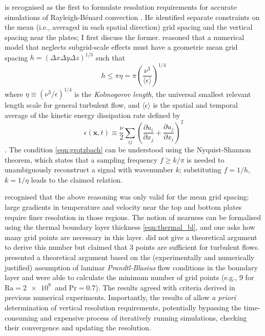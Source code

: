 \documentclass[titlepage]{article}
\numberwithin{equation}{section}
\newcommand{\pdiff}[2]{\frac{\partial #1}{\partial #2}}
\renewcommand\vec{\bm}
\newcommand{\prandtl}{\ensuremath{\mathrm{Pr}}}
\newcommand{\rayleigh}{\ensuremath{\mathrm{Ra}}}
\newcommand{\rb}{Rayleigh-B\'{e}nard}
\begin{document}
\textcite{grotzbach1983} is recognised as the first to formulate resolution
requirements for accurate simulations of \rb{} convection
\parencite{chilla2012,scheel2013}. He identified separate constraints on the
mean (i.e., averaged in each spatial direction) grid spacing and the vertical
spacing near the plates; I first discuss the former.
\citeauthor{grotzbach1983} reasoned that a numerical model that neglects
subgrid-scale effects must have a geometric mean grid spacing $h = (\Delta x
\Delta y \Delta z)^{1/3}$ such that
\begin{equation}
    \label{eqn:grotzbach}
    h \leq \pi \eta = \pi \left(
        \frac{\nu^3}{\langle \epsilon \rangle}
    \right)^{1/4}
\end{equation}
where $\eta \equiv (\nu^3/\epsilon)^{1/4}$ is the \emph{Kolmogorov length}, the
universal smallest relevant length scale for general turbulent flow, and
$\langle \epsilon \rangle$ is the spatial and temporal average of the kinetic
energy dissipation rate defined by
\begin{equation}
    \label{eqn:kinetic_dissipation}
    \epsilon(\vec{x}, t) \equiv \frac{\nu}{2} \sum_{ij} \left(
        \pdiff{u_i}{x_j} + \pdiff{u_j}{x_i}
    \right)^2
\end{equation}
\parencite{chilla2012}. The condition \cref{eqn:grotzbach} can be
understood using the Nyquist-Shannon theorem, which states that a
sampling frequency $f \geq k/\pi$ is needed to unambiguously reconstruct
a signal with wavenumber $k$; substituting $f = 1/h$, $k = 1/\eta$ leads
to the claimed relation.

\citeauthor{grotzbach1983} recognised that the above reasoning was only valid
for the mean grid spacing; large gradients in temperature and velocity near the
top and bottom plates require finer resolution in those regions. The notion of
nearness can be formalised using the thermal boundary layer thickness
\cref{eqn:thermal_bl}, and one asks how many grid points are necessary in this
layer. \citeauthor{grotzbach1983} did not give a theoretical argument to derive
this number but claimed that 3 points are sufficient for turbulent flows.
\textcite{shishkina2010} presented a theoretical argument based on the
(experimentally and numerically justified) assumption of laminar
\emph{Prandtl-Blasius} flow conditions in the boundary layer and were able to
calculate the minimum number of grid points (e.g., 9 for $\rayleigh =
\SI{2e9}{}$ and $\prandtl = 0.7$). The results agreed with criteria derived in
previous numerical experiments. Importantly, the results of
\citeauthor{shishkina2010} allow \emph{a priori} determination of vertical
resolution requirements, potentially bypassing the time-consuming and expensive
process of iteratively running simulations, checking their convergence and
updating the resolution.
\end{document}
